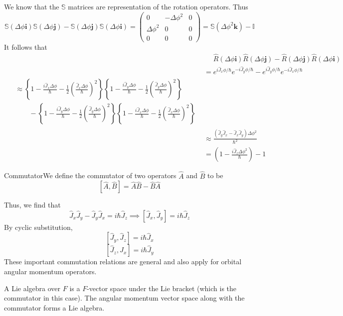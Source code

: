\documentclass{report}
\newcommand{\dfn}[2]{\begin{Definition}[colbacktitle=red!75!black]{#1}{}#2\end{Definition}}
\newcommand{\nt}[1]{\begin{note}#1\end{note}}
\begin{document}
We know that the \(\mathbb S\) matrices are representation of the rotation operators. Thus
\[
\mathbb S ( \Delta \phi \mathbf i) \mathbb S (\Delta \phi \mathbf j) -\mathbb S ( \Delta \phi \mathbf j) \mathbb S (\Delta \phi \mathbf i) = \begin{pmatrix} 0 & - \Delta \phi ^2 & 0 \\ \Delta \phi ^2 & 0 & 0 \\ 0 & 0 & 0 \end{pmatrix} = \mathbb S (\Delta \phi ^2 \mathbf k) - \mathbb I
\]
It follows that 
\begin{align*}
&\mathrel{\phantom{=}} \hat R(\Delta \phi \mathbf i) \hat R(\Delta \phi \mathbf j) - \hat R(\Delta \phi \mathbf j)\hat R(\Delta \phi \mathbf i)\\
&=e^{i \hat J _x \phi / \hbar} e^{-i \hat J _y \phi / \hbar} - e^{i \hat J_y \phi / \hbar} e^{-i \hat J _x \phi / \hbar} \\
\begin{split}
&\approx \left\{ 1 - \frac{i \hat J_x \Delta \phi}{\hbar} - \frac{1}{2}\left(\frac{\hat J_x \Delta \phi}{\hbar}\right)^2\right\} \left\{ 1 - \frac{i \hat J_y \Delta \phi}{\hbar} - \frac{1}{2}\left(\frac{\hat J_y \Delta \phi}{\hbar}\right)^2\right\}\\
& \qquad - \left\{ 1 - \frac{i \hat J_y \Delta \phi}{\hbar} - \frac{1}{2}\left(\frac{\hat J_y \Delta \phi}{\hbar}\right)^2\right\} \left\{ 1 - \frac{i \hat J_x \Delta \phi}{\hbar} - \frac{1}{2}\left(\frac{\hat J_x \Delta \phi}{\hbar}\right)^2\right\} 
\end{split}\\
&\approx  \frac{(\hat J_y \hat J_x - \hat J_x \hat J_y)\Delta \phi^2 }{\hbar^2}\\
&= \left( 1 - \frac{i \hat J_z \Delta \phi ^2}{\hbar} \right) -1
\end{align*}
\dfn{Commutator}{We define the commutator of two operators \(\hat A\) and \(\hat B\) to be 
\[
 [ \hat A, \hat B ] = \hat A \hat B - \hat B \hat A
\]}
Thus, we find that \[
\hat J_x  \hat J_y - \hat J_y \hat J_x = i \hbar \hat J_z \implies [\hat J_x , \hat J_y ] = i \hbar \hat J_z
\] 
By cyclic substitution, 
\[
[\hat J_y, \hat J_z ] = i \hbar \hat J_x
\] 
\[
[\hat J_z, \hat J_x] = i \hbar \hat J_y
\] 
These important commutation relations are general and also apply for orbital angular momentum operators. 
\nt{A Lie algebra over \(F\) is a \(F\)-vector space under the Lie bracket (which is the commutator in this case). The angular momentum vector space along with the commutator forms a Lie algebra. }
\end{document}
